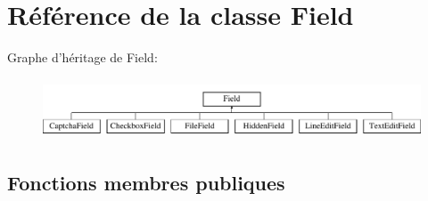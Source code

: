 \hypertarget{class_library_1_1_field}{\section{Référence de la classe Field}
\label{class_library_1_1_field}
}
Graphe d'héritage de Field\+:\begin{figure}[H]
\begin{center}
\leavevmode
\includegraphics[height=1.794872cm]{class_library_1_1_field}
\end{center}
\end{figure}
\subsection*{Fonctions membres publiques}

